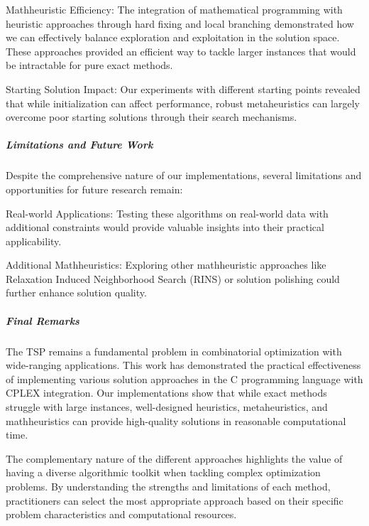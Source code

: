 \documentclass{article}
\begin{document}
Mathheuristic Efficiency: The integration of mathematical programming with heuristic approaches through hard fixing and local branching demonstrated how we can effectively balance exploration and exploitation in the solution space. These approaches provided an efficient way to tackle larger instances that would be intractable for pure exact methods.

Starting Solution Impact: Our experiments with different starting points revealed that while initialization can affect performance, robust metaheuristics can largely overcome poor starting solutions through their search mechanisms.

\subparagraph{Limitations and Future Work}
Despite the comprehensive nature of our implementations, several limitations and opportunities for future research remain:

Real-world Applications: Testing these algorithms on real-world data with additional constraints would provide valuable insights into their practical applicability.

Additional Mathheuristics: Exploring other mathheuristic approaches like Relaxation Induced Neighborhood Search (RINS) or solution polishing could further enhance solution quality.

\subparagraph{Final Remarks}
The TSP remains a fundamental problem in combinatorial optimization with wide-ranging applications. This work has demonstrated the practical effectiveness of 
implementing various solution approaches in the C programming language with CPLEX integration. Our implementations show that while exact methods struggle with large instances, 
well-designed heuristics, metaheuristics, and mathheuristics can provide high-quality solutions in reasonable computational time.

The complementary nature of the different approaches highlights the value of having a diverse algorithmic toolkit when tackling complex optimization problems. 
By understanding the strengths and limitations of each method, practitioners can select the most appropriate approach based on their specific problem characteristics and computational resources.




\end{document}
